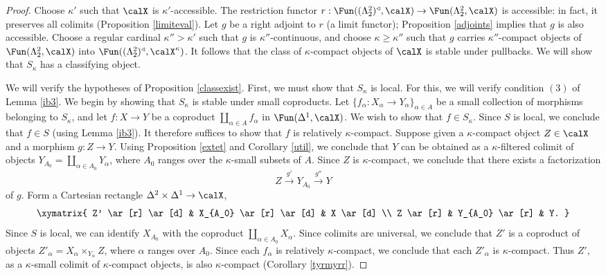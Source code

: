 \begin{proof}
Choose $\kappa'$ such that $\calX$ is $\kappa'$-accessible.
The restriction functor $r: 
\Fun( (\Lambda^2_2)^{\triangleleft}, \calX) \rightarrow \Fun( \Lambda^2_2, \calX)$
is accessible: in fact, it preserves all colimits (Proposition \ref{limiteval}). Let $g$ be a right adjoint to $r$ (a limit functor); Proposition \ref{adjoints} implies that $g$ is also accessible. Choose a regular cardinal $\kappa'' > \kappa'$ such that $g$ is $\kappa''$-continuous, and choose $\kappa \geq \kappa''$ such that $g$ carries $\kappa''$-compact objects of 
$\Fun(\Lambda^2_2, \calX)$ into $\Fun( (\Lambda^2_2)^{\triangleleft}, \calX^{\kappa})$. It follows that the class of $\kappa$-compact objects of $\calX$ is stable under pullbacks. We will show that $S_{\kappa}$ has a classifying object.

We will verify the hypotheses of Proposition \ref{classexist}. First, we must show that $S_{\kappa}$ is local. For this, we will verify condition $(3)$ of Lemma \ref{ib3}. We begin by showing that
$S_{\kappa}$ is stable under small coproducts. Let $\{ f_{\alpha}: X_{\alpha} \rightarrow Y_{\alpha} \}_{\alpha \in A}$ be a small collection of morphisms belonging to $S_{\kappa}$, and let $f: X \rightarrow Y$
be a coproduct $\coprod_{\alpha \in A} f_{\alpha}$ in $\Fun(\Delta^1,\calX)$. We wish to show that $f \in S_{\kappa}$. Since $S$ is local, we conclude that $f \in S$ (using Lemma \ref{ib3}). It therefore suffices to show that $f$ is relatively $\kappa$-compact. Suppose given a $\kappa$-compact
object $Z \in \calX$ and a morphism $g: Z \rightarrow Y$. Using Proposition \ref{extet} and Corollary \ref{util}, we conclude that $Y$ can be obtained as a $\kappa$-filtered colimit of objects
$Y_{A_0} = \coprod_{ \alpha \in A_0} Y_{\alpha}$, where $A_0$ ranges over the $\kappa$-small subsets of $A$. Since $Z$ is $\kappa$-compact, we conclude that there exists a factorization
$$ Z \stackrel{g'}{\rightarrow} Y_{A_0} \stackrel{g''}{\rightarrow} Y$$
of $g$. Form a Cartesian rectangle $\Delta^2 \times \Delta^1 \rightarrow \calX$,
$$ \xymatrix{ Z' \ar[r] \ar[d] & X_{A_0} \ar[r] \ar[d] & X \ar[d] \\
Z \ar[r] & Y_{A_0} \ar[r] & Y. }$$
Since $S$ is local, we can identify $X_{A_0}$ with the coproduct $\coprod_{\alpha \in A_0} X_{\alpha}$. Since colimits are universal, we conclude that $Z'$ is a coproduct of
objects $Z'_{\alpha} = X_{\alpha} \times_{Y_{\alpha} } Z$, where $\alpha$ ranges over
$A_0$. Since each $f_{\alpha}$ is relatively $\kappa$-compact, we conclude that each $Z'_{\alpha}$ is $\kappa$-compact. Thus $Z'$, as a $\kappa$-small colimit of $\kappa$-compact objects, is also $\kappa$-compact (Corollary \ref{tyrmyrr}). 


\end{proof}
